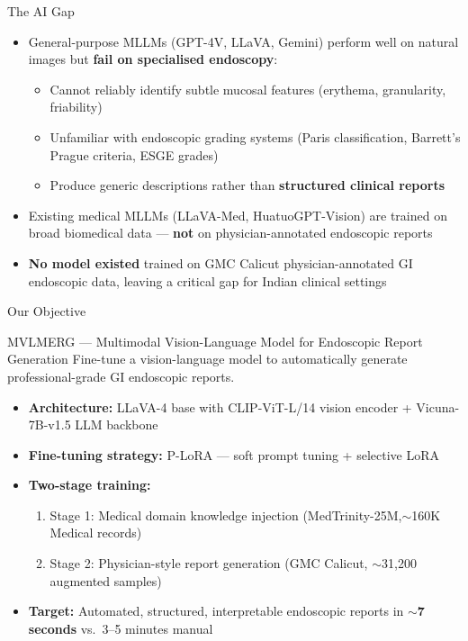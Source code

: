 ﻿\documentclass[aspectratio=169]{beamer}
\begin{document}
\begin{frame}{The AI Gap}
\begin{itemize}
    \item General-purpose MLLMs (GPT-4V, LLaVA, Gemini) perform well on natural images but \textbf{fail on specialised endoscopy}:
    \begin{itemize}
        \item Cannot reliably identify subtle mucosal features (erythema, granularity, friability)
        \item Unfamiliar with endoscopic grading systems (Paris classification, Barrett's Prague criteria, ESGE grades)
        \item Produce generic descriptions rather than \textbf{structured clinical reports}
    \end{itemize}
    \item Existing medical MLLMs (LLaVA-Med, HuatuoGPT-Vision) are trained on broad biomedical data --- \textbf{not} on physician-annotated endoscopic reports
    \item \textbf{No model existed} trained on GMC Calicut physician-annotated GI endoscopic data, leaving a critical gap for Indian clinical settings
\end{itemize}
\end{frame}

\begin{frame}{Our Objective}
\begin{block}{MVLMERG --- Multimodal Vision-Language Model for Endoscopic Report Generation}
Fine-tune a vision-language model to automatically generate professional-grade GI endoscopic reports.
\end{block}
\vspace{0.5em}
\begin{itemize}
    \item \textbf{Architecture:} LLaVA-4 base with CLIP-ViT-L/14 vision encoder + Vicuna-7B-v1.5 LLM backbone
    \item \textbf{Fine-tuning strategy:} P-LoRA --- soft prompt tuning + selective LoRA
    \item \textbf{Two-stage training:}
    \begin{enumerate}
        \item Stage 1: Medical domain knowledge injection (MedTrinity-25M,$\sim$160K Medical records)
        \item Stage 2: Physician-style report generation (GMC Calicut, $\sim$31,200 augmented samples)
    \end{enumerate}
    \item \textbf{Target:} Automated, structured, interpretable endoscopic reports in $\sim$\textbf{7 seconds} vs.\ 3--5 minutes manual
\end{itemize}
\end{frame}
\end{document}
